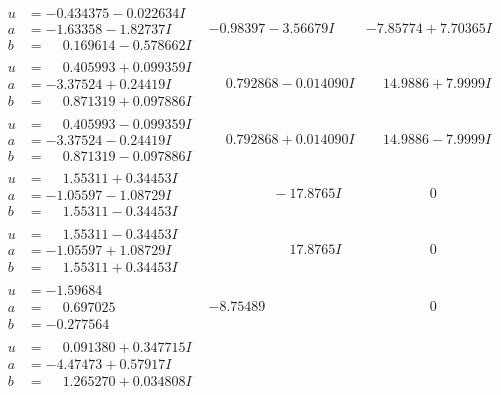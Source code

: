 \documentclass[1p]{elsarticle_modified}
\theoremstyle{definition}
\begin{document}
$$\begin{array}{c|c|c}
\begin{aligned}
u &= -0.434375 - 0.022634 I \\
a &= -1.63358 - 1.82737 I \\
b &= \phantom{-}0.169614 - 0.578662 I\end{aligned}
 & -0.98397 - 3.56679 I & -7.85774 + 7.70365 I \\ \hline\begin{aligned}
u &= \phantom{-}0.405993 + 0.099359 I \\
a &= -3.37524 + 0.24419 I \\
b &= \phantom{-}0.871319 + 0.097886 I\end{aligned}
 & \phantom{-}0.792868 - 0.014090 I & \phantom{-}14.9886 + 7.9999 I \\ \hline\begin{aligned}
u &= \phantom{-}0.405993 - 0.099359 I \\
a &= -3.37524 - 0.24419 I \\
b &= \phantom{-}0.871319 - 0.097886 I\end{aligned}
 & \phantom{-}0.792868 + 0.014090 I & \phantom{-}14.9886 - 7.9999 I \\ \hline\begin{aligned}
u &= \phantom{-}1.55311 + 0.34453 I \\
a &= -1.05597 - 1.08729 I \\
b &= \phantom{-}1.55311 - 0.34453 I\end{aligned}
 & \phantom{-0.000000 } -17.8765 I & \phantom{-0.000000 } 0 \\ \hline\begin{aligned}
u &= \phantom{-}1.55311 - 0.34453 I \\
a &= -1.05597 + 1.08729 I \\
b &= \phantom{-}1.55311 + 0.34453 I\end{aligned}
 & \phantom{-0.000000 -}17.8765 I & \phantom{-0.000000 } 0 \\ \hline\begin{aligned}
u &= -1.59684\phantom{ +0.000000I} \\
a &= \phantom{-}0.697025\phantom{ +0.000000I} \\
b &= -0.277564\phantom{ +0.000000I}\end{aligned}
 & -8.75489\phantom{ +0.000000I} & \phantom{-0.000000 } 0 \\ \hline\begin{aligned}
u &= \phantom{-}0.091380 + 0.347715 I \\
a &= -4.47473 + 0.57917 I \\
b &= \phantom{-}1.265270 + 0.034808 I\end{aligned}

\end{array}$$
\end{document}
